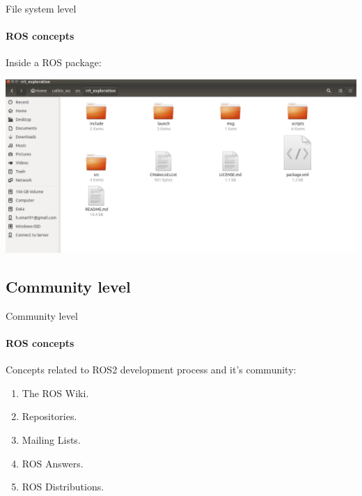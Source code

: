 \documentclass{beamer}
\begin{document}
\begin{frame}{File system level}
    \framesubtitle{ROS concepts}
Inside a ROS package:

\vspace{0.5cm}
\centering
\includegraphics[width=.9\linewidth]{figures/example_package.png}
\end{frame}
    


\subsection{Community level}
\begin{frame}{Community level}
    \framesubtitle{ROS concepts}
    
    Concepts related to ROS2 development process and it's community:
    
    \begin{enumerate}
        \item The ROS Wiki.
        \item Repositories.
        \item Mailing Lists.
        \item ROS Answers.
        \item ROS Distributions.
    \end{enumerate}
\end{frame}
\end{document}
